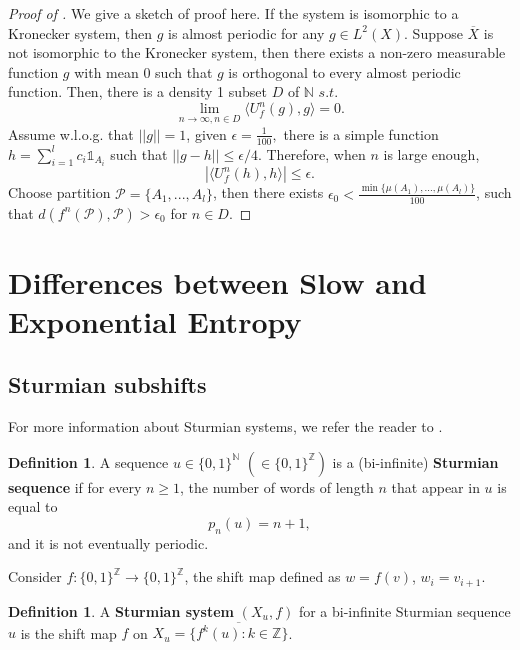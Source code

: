\documentclass[oneside]{amsart}
\theoremstyle{plain}
\theoremstyle{definition}
\newtheorem{DEF}[THM]{Definition}
\newcommand{\<}{\langle}
\renewcommand{\>}{\rangle}
\renewcommand{\P}{\mathcal{P}}
\newcommand{\Z}{\mathbb{Z}}
\newcommand{\e}{\epsilon}
\newcommand{\N}{\mathbb{N}}
\renewcommand{\bar}{\overline}
\renewcommand{\|}{|\!|} %
\begin{document}
\begin{proof}[Proof of ]
    We give a sketch of proof here.
    If the system is isomorphic to a Kronecker system, then $g$ is almost periodic for any $g\in L^2(X)$.
    Suppose $\bar{X}$ is not isomorphic to the Kronecker system, then there exists a non-zero measurable function $g$ with mean $0$ such that $g$ is orthogonal to every almost periodic function. Then, there is a density 1 subset $D$ of $\mathbb{N}$ $s.t.$ \[\displaystyle\lim_{n\rightarrow \infty, n\in D}\langle U_f^n(g),g \rangle =0.\] Assume w.l.o.g. that \(\|g\|=1\), given \(\epsilon=\frac{1}{100},\) there is a simple function \(h=\sum\limits_{i=1}^{l}c_i\mathds{1}_{A_i}\) such that \(\|g-h\|\leq \e/4.\) Therefore, when \(n\) is large enough, \[|\langle U_f^n(h),h\rangle|\leq \e.\]  Choose partition \(\P=\{A_1,...,A_l\}\), then there exists \(\e_0<\frac{\min\{\mu(A_1),...,\mu(A_l)\}}{100} \), such that \(d(f^n(\P),\P)>\e_0\) for \(n\in D.\)
\end{proof}

\section{Differences between Slow and Exponential Entropy}

\subsection{Sturmian subshifts}
\label{sec:sturmian}
For more information about Sturmian systems, we refer the reader to \cite[Chapter 6]{Pytheas}.
\begin{DEF}
    A sequence $u \in \{0,1\}^{\N}$ $(\in \{0,1\}^\Z)$  is a (bi-infinite) {\bf Sturmian sequence} if for every $n \ge 1$, the number of words of length $n$ that appear in $u$ is equal to
    \begin{equation*}
        p_n(u) = n+1,
    \end{equation*}
    and it is not eventually periodic.
\end{DEF}
Consider $f \colon \{0,1\}^\Z \to \{0,1\}^\Z$, the shift map defined as $w = f(v)$, $w_i = v_{i+1}$.

\begin{DEF}
    A {\bf Sturmian system} $(X_u,f)$ for a bi-infinite Sturmian sequence $u$ is the shift map $f$ on  
    $X_u = \overline{\{f^k(u):k\in \Z\}}$.
\end{DEF}
\end{document}
